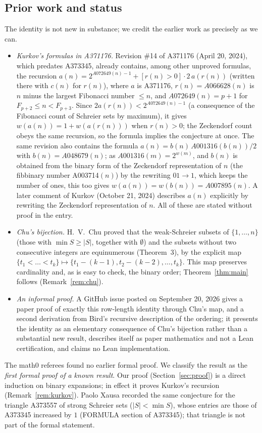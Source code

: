 \documentclass[11pt]{amsart}
\theoremstyle{plain}
\theoremstyle{definition}
\begin{document}
\subsection*{Prior work and status}
The identity is not new in substance; we credit the earlier work as precisely as we can.
\begin{itemize}
\item \emph{Kurkov's formulas in A371176.} Revision \#14 of A371176 (April 20, 2024), which predates A373345, already contains, among other unproved formulas, the recursion
$a(n)=2^{A072649(n)-1}+[r(n)>0]\cdot2\,a(r(n))$ (written there with $c(n)$ for $r(n)$), where $a$ is A371176, $r(n)=A066628(n)$ is $n$ minus the largest Fibonacci number $\le n$, and $A072649(n)=p+1$ for $F_{p+2}\le n<F_{p+3}$.
Since $2a(r(n))<2^{A072649(n)-1}$ (a consequence of the Fibonacci count of Schreier sets by maximum), it gives $w(a(n))=1+w(a(r(n)))$ when $r(n)>0$; the Zeckendorf count obeys the same recursion, so the formula implies the conjecture at once. The same revision also contains the formula $a(n)=b(n)\,A001316(b(n))/2$ with $b(n)=A048679(n)$; as $A001316(m)=2^{w(m)}$, and $b(n)$ is obtained from the binary form of the Zeckendorf representation of $n$ (the fibbinary number A003714$(n)$) by the rewriting $01\to1$, which keeps the number of ones, this too gives $w(a(n))=w(b(n))=A007895(n)$. A later comment of Kurkov (October 21, 2024) describes $a(n)$ explicitly by rewriting the Zeckendorf representation of $n$. All of these are stated without proof in the entry.
\item \emph{Chu's bijection.} H.~V.~Chu \cite{Chu} proved that the weak-Schreier subsets of $\{1,\dots,n\}$ (those with $\min S\ge|S|$, together with $\emptyset$) and the subsets without two consecutive integers are equinumerous (Theorem~3), by the explicit map $\{t_1<\dots<t_k\}\mapsto\{t_1-(k-1),t_2-(k-2),\dots,t_k\}$. This map preserves cardinality and, as is easy to check, the binary order; Theorem~\ref{thm:main} follows (Remark~\ref{rem:chu}).
\item \emph{An informal proof.} A GitHub issue posted on September 20, 2026 \cite{Issue} gives a paper proof of exactly this row-length identity through Chu's map, and a second derivation from Bird's recursive description of the ordering; it presents the identity as an elementary consequence of Chu's bijection rather than a substantial new result, describes itself as paper mathematics and not a Lean certification, and claims no Lean implementation.
\end{itemize}
The math0 referees found no earlier formal proof. We classify the result as the \emph{first formal proof of a known result}. Our proof (Section~\ref{sec:proof}) is a direct induction on binary expansions; in effect it proves Kurkov's recursion (Remark~\ref{rem:kurkov}). Paolo Xausa recorded the same conjecture for the triangle A373557 of strong Schreier sets ($|S|<\min S$), whose entries are those of A373345 increased by $1$ (FORMULA section of A373345); that triangle is not part of the formal statement.
\end{document}
